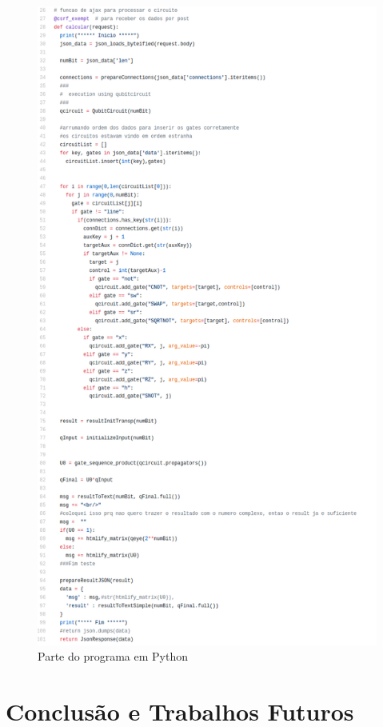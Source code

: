 \documentclass[a4paper, 12pt, oneside]{book}
\begin{document}
\begin{figure}[H]
\centering
\includegraphics[scale=0.40]{view.png}
\caption{Parte do programa em Python}
\label{fig:resPython}
\end{figure}

\chapter{Conclusão e Trabalhos Futuros}
\thispagestyle{empty} 
\end{document}
